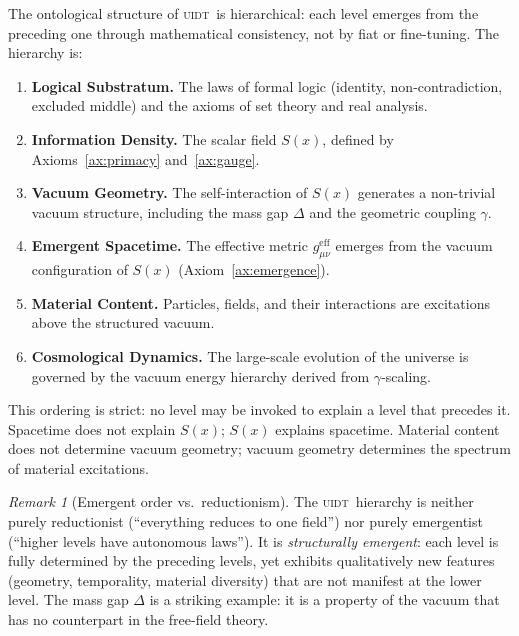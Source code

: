 \documentclass[12pt,a4paper,twoside]{article}
\theoremstyle{plain}
\theoremstyle{definition}
\theoremstyle{remark}
\newtheorem{remark}[theorem]{Remark}
\newcommand{\UIDT}{\textsc{uidt}}
\newcommand{\Sx}{S(x)}
\begin{document}
The ontological structure of \UIDT\ is hierarchical: each level emerges from
the preceding one through mathematical consistency, not by fiat or fine-tuning.
The hierarchy is:
\begin{enumerate}
  \item \textbf{Logical Substratum.} The laws of formal logic (identity,
    non-contradiction, excluded middle) and the axioms of set theory and
    real analysis.
  \item \textbf{Information Density.} The scalar field $\Sx$, defined by
    Axioms~\ref{ax:primacy} and~\ref{ax:gauge}.
  \item \textbf{Vacuum Geometry.} The self-interaction of $\Sx$ generates a
    non-trivial vacuum structure, including the mass gap $\Delta$ and the
    geometric coupling $\gamma$.
  \item \textbf{Emergent Spacetime.} The effective metric
    $g_{\mu\nu}^{\mathrm{eff}}$ emerges from the vacuum configuration of $\Sx$
    (Axiom~\ref{ax:emergence}).
  \item \textbf{Material Content.} Particles, fields, and their interactions
    are excitations above the structured vacuum.
  \item \textbf{Cosmological Dynamics.} The large-scale evolution of the
    universe is governed by the vacuum energy hierarchy derived from $\gamma$-scaling.
\end{enumerate}

This ordering is strict: no level may be invoked to explain a level that
precedes it. Spacetime does not explain $\Sx$; $\Sx$ explains spacetime.
Material content does not determine vacuum geometry; vacuum geometry determines
the spectrum of material excitations.

\begin{remark}[Emergent order vs.\ reductionism]
The \UIDT\ hierarchy is neither purely reductionist (``everything reduces to
one field'') nor purely emergentist (``higher levels have autonomous laws'').
It is \emph{structurally emergent}: each level is fully determined by the
preceding levels, yet exhibits qualitatively new features (geometry, temporality,
material diversity) that are not manifest at the lower level. The mass gap
$\Delta$ is a striking example: it is a property of the vacuum that has no
counterpart in the free-field theory.
\end{remark}

\newpage
\end{document}
